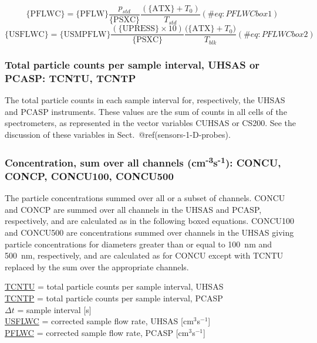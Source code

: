 \documentclass[
  english,
]{book}
\begin{document}
\begin{equation}
\mathrm{\{PFLWC\}}=\mathrm{\{PFLW\}}\frac{p_{std}}{\mathrm{\{PSXC\}}}\frac{(\mathrm{\{ATX\}}+T_{0})}{T_{std}}  
(\#eq:PFLWCbox1)
\end{equation} \begin{equation}
\mathrm{\{USFLWC\}}=\mathrm{\{USMPFLW\}}\frac{(\mathrm{\{UPRESS\}}\times 10)} {\mathrm{\{PSXC\}}}\frac{\mathrm{(\{ATX\}}+T_{0})}{T_{blk}}  
(\#eq:PFLWCbox2)
\end{equation}

\hypertarget{tcntu-tcntp}{%
\subsubsection*{Total particle counts per sample interval, UHSAS or
PCASP: TCNTU, TCNTP}\label{tcntu-tcntp}}

The total particle counts in each sample interval for, respectively, the
UHSAS and PCASP instruments. These values are the sum of counts in all
cells of the spectrometers, as represented in the vector variables
CUHSAS or CS200. See the discussion of these variables in
Sect.~@ref(sensors-1-D-probes).

\hypertarget{concu-concp}{%
\subsubsection*{\texorpdfstring{Concentration, sum over all channels
(cm\textsuperscript{-3}s\textsuperscript{-1}): CONCU, CONCP, CONCU100,
CONCU500}{Concentration, sum over all channels (cm-3s-1): CONCU, CONCP, CONCU100, CONCU500}}\label{concu-concp}}

The particle concentrations summed over all or a subset of channels.
CONCU and CONCP are summed over all channels in the UHSAS and PCASP,
respectively, and are calculated as in the following boxed equations.
CONCU100 and CONCU500 are concentrations summed over channels in the
UHSAS giving particle concentrations for diameters greater than or equal
to 100~nm and 500~nm, respectively, and are calculated as for CONCU
except with TCNTU replaced by the sum over the appropriate channels.

\protect\hyperlink{tcntu-tcntp}{TCNTU} = total particle counts per
sample interval, UHSAS\\
\protect\hyperlink{tcntu-tcntp}{TCNTP} = total particle counts per
sample interval, PCASP\\
\(\Delta t\) = sample
interval {[}s{]}\\
\protect\hyperlink{pflw}{USFLWC} = corrected sample flow rate, UHSAS
{[}cm\(^{3}\)s\(^{-1}\){]}\\
\protect\hyperlink{pflw}{PFLWC} = corrected sample flow rate, PCASP
{[}cm\(^{3}\)s\(^{-1}\){]}
\end{document}
